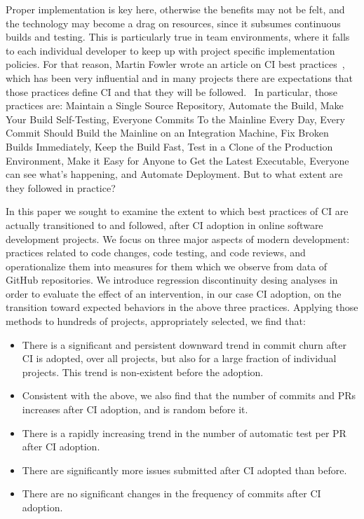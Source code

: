 \documentclass[conference]{IEEEtran}
\begin{document}
Proper implementation is key here, otherwise the benefits may not be felt, and the technology may become a drag on resources, since it subsumes continuous builds and testing. 
This is particularly true in team environments, where it falls to each individual developer to keep up with project specific implementation policies.
For that reason, Martin Fowler wrote an article on CI best practices~\cite{}, which has been very influential and in many projects there are expectations that those practices define CI and that they will be followed.~\cite{}
In particular, those practices are: Maintain a Single Source Repository,  Automate the Build, Make Your Build Self-Testing, Everyone Commits To the Mainline Every Day, Every Commit Should Build the Mainline on an Integration Machine, Fix Broken Builds Immediately, Keep the Build Fast, Test in a Clone of the Production Environment, Make it Easy for Anyone to Get the Latest Executable, Everyone can see what's happening, and Automate Deployment.
But to what extent are they followed in practice?

In this paper we sought to examine the extent to which best practices of CI are actually transitioned to and followed, after CI adoption in online software development projects.  We focus on three major aspects of modern development: practices related to code changes, code testing, and code reviews, and operationalize them into measures for them which we observe from data of GitHub repositories.
We introduce regression discontinuity desing analyses in order to evaluate the effect of an intervention, in our case CI adoption, on the transition toward expected behaviors in the above three practices.
Applying those methods to hundreds of projects, appropriately selected, we find that:

\begin{itemize}

\item There is a significant and persistent downward trend in commit churn after CI is adopted, over all projects, but also for a large fraction of individual projects. This trend is non-existent before the adoption.

\item Consistent with the above, we also find that the number of commits and PRs increases after CI adoption, and is random before it.

\item There is a rapidly increasing trend in the number of automatic test per PR after CI adoption.

\item There are significantly more issues submitted after CI adopted than before.

\item There are no significant changes in the frequency of commits after CI adoption.
\end{itemize}
\end{document}
